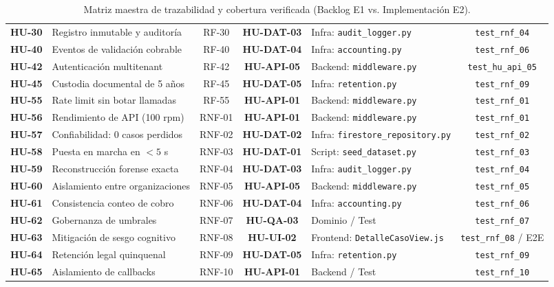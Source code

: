 \documentclass[11pt,letterpaper]{article}
\begin{document}
\begin{table}[h]
\begin{tabularx}{\textwidth}{c P{3.2cm} c c P{3.8cm} c}
\textbf{HU-30} & Registro inmutable y auditoría & RF-30 & \textbf{HU-DAT-03} & Infra: \texttt{audit\_logger.py} & \texttt{test\_rnf\_04} \\
\textbf{HU-40} & Eventos de validación cobrable & RF-40 & \textbf{HU-DAT-04} & Infra: \texttt{accounting.py} & \texttt{test\_rnf\_06} \\
\textbf{HU-42} & Autenticación multitenant & RF-42 & \textbf{HU-API-05} & Backend: \texttt{middleware.py} & \texttt{test\_hu\_api\_05} \\
\textbf{HU-45} & Custodia documental de 5 años & RF-45 & \textbf{HU-DAT-05} & Infra: \texttt{retention.py} & \texttt{test\_rnf\_09} \\
\textbf{HU-55} & Rate limit sin botar llamadas & RF-55 & \textbf{HU-API-01} & Backend: \texttt{middleware.py} & \texttt{test\_rnf\_01} \\
\textbf{HU-56} & Rendimiento de API (100 rpm) & RNF-01 & \textbf{HU-API-01} & Backend: \texttt{middleware.py} & \texttt{test\_rnf\_01} \\
\textbf{HU-57} & Confiabilidad: 0 casos perdidos & RNF-02 & \textbf{HU-DAT-02} & Infra: \texttt{firestore\_repository.py} & \texttt{test\_rnf\_02} \\
\textbf{HU-58} & Puesta en marcha en $<5$ s & RNF-03 & \textbf{HU-DAT-01} & Script: \texttt{seed\_dataset.py} & \texttt{test\_rnf\_03} \\
\textbf{HU-59} & Reconstrucción forense exacta & RNF-04 & \textbf{HU-DAT-03} & Infra: \texttt{audit\_logger.py} & \texttt{test\_rnf\_04} \\
\textbf{HU-60} & Aislamiento entre organizaciones & RNF-05 & \textbf{HU-API-05} & Backend: \texttt{middleware.py} & \texttt{test\_rnf\_05} \\
\textbf{HU-61} & Consistencia conteo de cobro & RNF-06 & \textbf{HU-DAT-04} & Infra: \texttt{accounting.py} & \texttt{test\_rnf\_06} \\
\textbf{HU-62} & Gobernanza de umbrales & RNF-07 & \textbf{HU-QA-03} & Dominio / Test & \texttt{test\_rnf\_07} \\
\textbf{HU-63} & Mitigación de sesgo cognitivo & RNF-08 & \textbf{HU-UI-02} & Frontend: \texttt{DetalleCasoView.js} & \texttt{test\_rnf\_08} / E2E \\
\textbf{HU-64} & Retención legal quinquenal & RNF-09 & \textbf{HU-DAT-05} & Infra: \texttt{retention.py} & \texttt{test\_rnf\_09} \\
\textbf{HU-65} & Aislamiento de callbacks & RNF-10 & \textbf{HU-API-01} & Backend / Test & \texttt{test\_rnf\_10} \\
\bottomrule
\end{tabularx}
\caption{Matriz maestra de trazabilidad y cobertura verificada (Backlog E1 vs. Implementación E2).}
\label{tab:matriz-homologacion}
\end{table}
\end{document}
